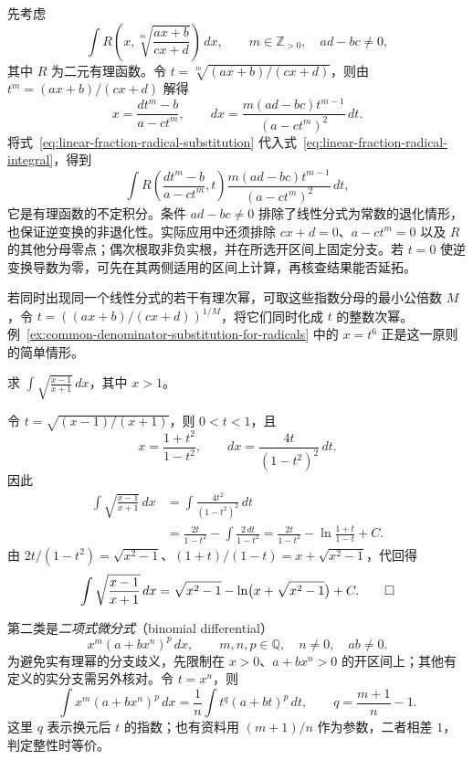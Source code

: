 \documentclass[UTF8,12pt,a4paper,fontset=fandol]{ctexbook}
\begin{document}
先考虑
\begin{equation}
    \int R\left(x,\sqrt[m]{\frac{ax+b}{cx+d}}\right)\,dx,
    \qquad m\in\mathbb{Z}_{>0},\quad ad-bc\neq0,
    \label{eq:linear-fraction-radical-integral}
\end{equation}
其中 $R$ 为二元有理函数。令 $t=\sqrt[m]{(ax+b)/(cx+d)}$，则由 $t^m=(ax+b)/(cx+d)$ 解得
\begin{equation}
    x=\frac{dt^m-b}{a-ct^m},\qquad
    dx=\frac{m(ad-bc)t^{m-1}}{(a-ct^m)^2}\,dt.
    \label{eq:linear-fraction-radical-substitution}
\end{equation}
将式~\eqref{eq:linear-fraction-radical-substitution} 代入式~\eqref{eq:linear-fraction-radical-integral}，得到
\[
    \int R\left(\frac{dt^m-b}{a-ct^m},t\right)
        \frac{m(ad-bc)t^{m-1}}{(a-ct^m)^2}\,dt,
\]
它是有理函数的不定积分。条件 $ad-bc\neq0$ 排除了线性分式为常数的退化情形，也保证逆变换的非退化性。实际应用中还须排除 $cx+d=0$、$a-ct^m=0$ 以及 $R$ 的其他分母零点；偶次根取非负实根，并在所选开区间上固定分支。若 $t=0$ 使逆变换导数为零，可先在其两侧适用的区间上计算，再核查结果能否延拓。

若同时出现同一个线性分式的若干有理次幂，可取这些指数分母的最小公倍数 $M$，令 $t=((ax+b)/(cx+d))^{1/M}$，将它们同时化成 $t$ 的整数次幂。例~\ref{ex:common-denominator-substitution-for-radicals} 中的 $x=t^6$ 正是这一原则的简单情形。

\begin{example}
\label{ex:linear-fraction-radical-rationalization}
求 $\displaystyle\int\sqrt{\frac{x-1}{x+1}}\,dx$，其中 $x>1$。
\end{example}

\begin{solve}
令 $t=\sqrt{(x-1)/(x+1)}$，则 $0<t<1$，且
\[
    x=\frac{1+t^2}{1-t^2},\qquad dx=\frac{4t}{(1-t^2)^2}\,dt.
\]
因此
\begin{align*}
    \int\sqrt{\frac{x-1}{x+1}}\,dx
       &=\int\frac{4t^2}{(1-t^2)^2}\,dt\\
       &=\frac{2t}{1-t^2}-\int\frac{2\,dt}{1-t^2}
        =\frac{2t}{1-t^2}-\ln\frac{1+t}{1-t}+C.
\end{align*}
由 $2t/(1-t^2)=\sqrt{x^2-1}$、$(1+t)/(1-t)=x+\sqrt{x^2-1}$，代回得
\[
    \int\sqrt{\frac{x-1}{x+1}}\,dx
       =\sqrt{x^2-1}-\ln\bigl(x+\sqrt{x^2-1}\bigr)+C.
    \qedhere
\]
\end{solve}

第二类是\emph{二项式微分式}（binomial differential）
\begin{equation}
    x^m(a+bx^n)^p\,dx,
    \qquad m,n,p\in\mathbb{Q},\quad n\neq0,\quad ab\neq0.
    \label{eq:binomial-differential}
\end{equation}
为避免实有理幂的分支歧义，先限制在 $x>0$、$a+bx^n>0$ 的开区间上；其他有定义的实分支需另外核对。令 $t=x^n$，则
\begin{equation}
    \int x^m(a+bx^n)^p\,dx
       =\frac1n\int t^q(a+bt)^p\,dt,
    \qquad q=\frac{m+1}{n}-1.
    \label{eq:binomial-differential-standard-form}
\end{equation}
这里 $q$ 表示换元后 $t$ 的指数；也有资料用 $(m+1)/n$ 作为参数，二者相差 $1$，判定整性时等价。
\end{document}
